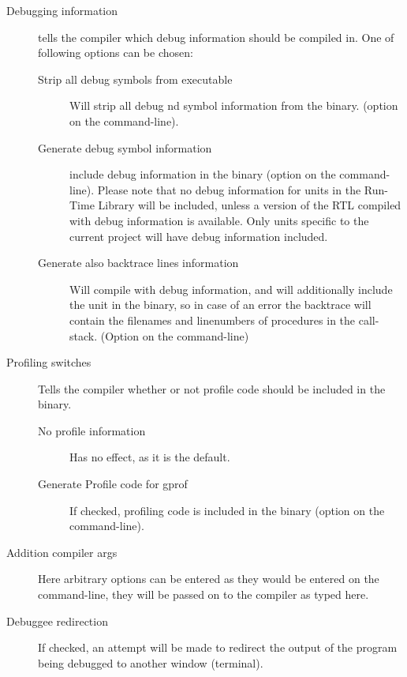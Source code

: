 \begin{description}
\item[Debugging information] tells the compiler which debug information
should be compiled in. One of following options can be chosen:
\begin{description}
\item[Strip all debug symbols from executable] Will strip all debug nd
symbol information from the binary. (option  on the command-line).
\item[Generate debug symbol information] include debug information in the
binary (option  on the command-line). Please note that no debug
information for units in the Run-Time Library will be included, unless a 
version of the RTL compiled with debug information is available. Only units
specific to the current project will have debug information included.
\item[Generate also backtrace lines information] Will compile with debug
information, and will additionally include the  unit in the
binary, so in case of an error the backtrace will contain the filenames and
linenumbers of procedures in the call-stack. (Option  on the
command-line)
\end{description}
\item[Profiling switches] Tells the compiler whether or not profile code
should be included in the binary.
\begin{description}
\item[No profile information] Has no effect, as it is the default.
\item[Generate Profile code for gprof] If checked, profiling code is
included in the binary (option  on the command-line).
\end{description}
\item[Addition compiler args] Here arbitrary options can be entered as they
would be entered on the command-line, they will be passed on to the compiler
as typed here.
\item[Debuggee redirection]
If checked, an attempt will be made to redirect the output of the program
being debugged to another window (terminal). 
\end{description}
 
%
%
